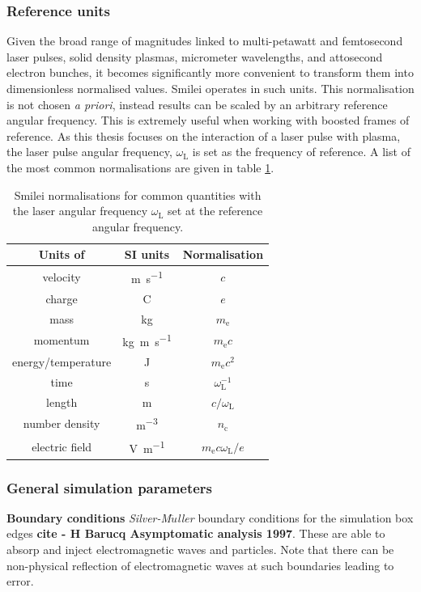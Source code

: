 \subsubsection{Reference units}
Given the broad range of magnitudes linked to multi-petawatt and femtosecond laser pulses, solid density plasmas, micrometer wavelengths, and attosecond electron bunches, it becomes significantly more convenient to transform them into dimensionless normalised values. Smilei operates in such units. This normalisation is not chosen \textit{a priori}, instead results can be scaled by an arbitrary reference angular frequency. This is extremely useful when working with boosted frames of reference. As this thesis focuses on the interaction of a laser pulse with plasma, the laser pulse angular frequency, $\omega_\mathrm{L}$ is set as the frequency of reference. A list of the most common normalisations are given in table \ref{tab:intro-normalisations}.

\begin{table}
\begin{center}
\begin{tabular}{ccc}
	 \hline \hline
	Units of & SI units & Normalisation \\
	\hline
	velocity & \unit{m.s^{-1}} & $c$ \\
	charge & C & $e$ \\
	mass & kg & $m_\mathrm{e}$ \\
	momentum & \unit{kg.m.s^{-1}} & $m_\mathrm{e}c$ \\
	energy/temperature & J & $m_\mathrm{e}c^2$ \\
	time & s & $\omega^{-1}_\mathrm{L}$ \\
	length & m & $c/\omega_\mathrm{L}$ \\
	number density & \unit{m^{-3}} & $n_\mathrm{c}$ \\
	electric field & \unit{V.m^{-1}} & $m_\mathrm{e}c\omega_\mathrm{L}/e$ \\
	\hline \hline
\end{tabular}
	\caption{\label{tab:intro-normalisations} Smilei normalisations for common quantities with the laser angular frequency $\omega_\mathrm{L}$ set at the reference angular frequency.}
\end{center}
\end{table}



\subsubsection{General simulation parameters}\label{sec:intro-general_simulation_paramers}
\textbf{Boundary conditions}
\textit{Silver-M$\ddot{u}$ller }boundary conditions for the simulation box edges \textbf{cite - H Barucq Asymptomatic analysis 1997}. These are able to absorp and inject electromagnetic waves and particles. Note that there can be non-physical reflection of electromagnetic waves at such boundaries leading to error.

